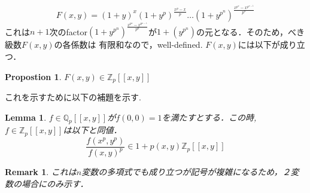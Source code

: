 \documentclass{ujarticle}
\newtheorem{prop}[thm]{Propostion}
\newtheorem{lem}[thm]{Lemma}
\newtheorem*{rem}{Remark}
\begin{document}
\begin{equation*}
 F(x,y)=(1+y)^x(1+y^p)^{\frac{x^p-x}{p}} \dots ({1+y^{p^n}})^{\frac{x^{p^n}-x^{p^{n-1}}}{p^n}}
\end{equation*}
これは$n+1$次のfactor$({1+y^{p^n}})^{\frac{x^{p^n}-x^{p^{n-1}}}{p^n}}$が$1+(y^{p^n})$の元となる．そのため，べき級数$F(x,y)$の各係数は
有限和なので，well-defined.
$F(x,y)$には以下が成り立つ．
\begin{prop}
 $F(x,y)\in \mathbb{Z}_p[[x,y]]$
\end{prop}
これを示すために以下の補題を示す.

\begin{lem}
 $f \in \mathbb{Q}_p[[x,y]]$が$f(0,0)=1$を満たすとする．この時,$f \in \mathbb{Z}_p[[x,y]]$は以下と同値．
 \begin{equation*}
  \frac{f(x^p,y^p)}{f(x,y)^p} \in 1 + p(x,y)\mathbb{Z}_p[[x,y]]
 \end{equation*}
\end{lem}
\begin{rem}
 これは$n$変数の多項式でも成り立つが記号が複雑になるため，２変数の場合にのみ示す．
\end{rem}
\end{document}
